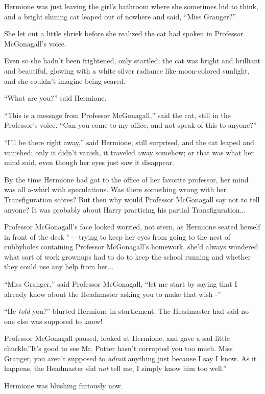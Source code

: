 Hermione was just leaving the girl's bathroom where she sometimes hid to
think, and a bright shining cat leaped out of nowhere and said, ``Miss
Granger?''

She let out a little shriek before she realized the cat had spoken in
Professor McGonagall's voice.

Even so she hadn't been frightened, only startled; the cat was bright
and brilliant and beautiful, glowing with a white silver radiance like
moon-colored sunlight, and she couldn't imagine being scared.

``What are you?'' said Hermione.

``This is a message from Professor McGonagall,'' said the cat, still in
the Professor's voice. ``Can you come to my office, and not speak of
this to anyone?''

``I'll be there right away,'' said Hermione, still surprised, and the
cat leaped and vanished; only it didn't vanish, it traveled away
somehow; or that was what her mind said, even though her eyes just saw
it disappear.

By the time Hermione had got to the office of her favorite professor,
her mind was all a-whirl with speculations. Was there something wrong
with her Transfiguration scores? But then why would Professor McGonagall
say not to tell anyone? It was probably about Harry practicing his
partial Transfiguration...

Professor McGonagall's face looked worried, not stern, as Hermione
seated herself in front of the desk "--- trying to keep her eyes from going
to the nest of cubbyholes containing Professor McGonagall's homework,
she'd always wondered what sort of work grownups had to do to keep the
school running and whether they could use any help from her...

``Miss Granger,'' said Professor McGonagall, ``let me start by saying
that I already know about the Headmaster asking you to make that wish
-''

``He \emph{told} you?'' blurted Hermione in startlement. The Headmaster
had said no one else was supposed to know!

Professor McGonagall paused, looked at Hermione, and gave a sad little
chuckle.''It's good to see Mr. Potter hasn't corrupted you too much.
Miss Granger, you aren't supposed to \emph{admit} anything just because
I say I know. As it happens, the Headmaster did \emph{not} tell me, I
simply know him too well.''

Hermione was blushing furiously now.


